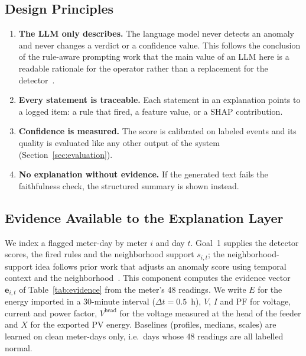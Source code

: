 \documentclass[11pt,a4paper]{article}
\begin{document}
\subsection{Design Principles}
\begin{enumerate}[leftmargin=*,itemsep=2pt]
  \item \textbf{The LLM only describes.} The language model never detects an anomaly and never changes a verdict or a confidence value. This follows the conclusion of the rule-aware prompting work that the main value of an LLM here is a readable rationale for the operator rather than a replacement for the detector~\cite{ruleaware}.
  \item \textbf{Every statement is traceable.} Each statement in an explanation points to a logged item: a rule that fired, a feature value, or a SHAP contribution.
  \item \textbf{Confidence is measured.} The score is calibrated on labeled events and its quality is evaluated like any other output of the system (Section~\ref{sec:evaluation}).
  \item \textbf{No explanation without evidence.} If the generated text fails the faithfulness check, the structured summary is shown instead.
\end{enumerate}

\subsection{Evidence Available to the Explanation Layer}
\label{sec:evidence}
We index a flagged meter-day by meter $i$ and day $t$. Goal~1 supplies the detector scores, the fired rules
and the neighborhood support $s_{i,t}$; the neighborhood-support idea follows prior work that adjusts an
anomaly score using temporal context and the neighborhood~\cite{multiuser}. This component computes the
evidence vector $\mathbf{e}_{i,t}$ of Table~\ref{tab:evidence} from the meter's 48 readings. We write $E$ for
the energy imported in a 30-minute interval ($\Delta t=0.5$~h), $V$, $I$ and $\mathrm{PF}$ for voltage,
current and power factor, $V^{\mathrm{head}}$ for the voltage measured at the head of the feeder and $X$ for
the exported PV energy. Baselines (profiles, medians, scales) are learned on clean meter-days only, i.e.\ days
whose 48 readings are all labelled normal.
\end{document}
